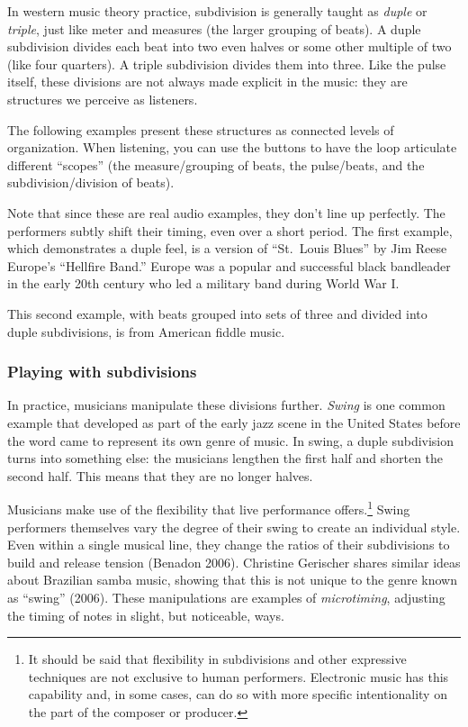 \documentclass[twoside]{article}
\begin{document}
In western music theory practice, subdivision is generally taught as
\emph{duple} or \emph{triple}, just like meter and measures (the larger
grouping of beats). A duple subdivision divides each beat into two even
halves or some other multiple of two (like four quarters). A triple
subdivision divides them into three. Like the pulse itself, these
divisions are not always made explicit in the music: they are structures
we perceive as listeners.

The following examples present these structures as connected levels of
organization. When listening, you can use the buttons to have the loop
articulate different ``scopes'' (the measure/grouping of beats, the
pulse/beats, and the subdivision/division of beats).

Note that since these are real audio examples, they don't line up
perfectly. The performers subtly shift their timing, even over a short
period. The first example, which demonstrates a duple feel, is a version
of ``St.~Louis Blues'' by Jim Reese Europe's ``Hellfire Band.'' Europe
was a popular and successful black bandleader in the early 20th century
who led a military band during World War I.

\hypertarget{example15}{}

This second example, with beats grouped into sets of three and divided
into duple subdivisions, is from American fiddle music.

\hypertarget{example16}{}

\hypertarget{playing-with-subdivisions}{%
\subsubsection{Playing with
subdivisions}\label{playing-with-subdivisions}}

In practice, musicians manipulate these divisions further. \emph{Swing}
is one common example that developed as part of the early jazz scene in
the United States before the word came to represent its own genre of
music. In swing, a duple subdivision turns into something else: the
musicians lengthen the first half and shorten the second half. This
means that they are no longer halves.

Musicians make use of the flexibility that live performance
offers.\footnote{It should be said that flexibility in subdivisions and
  other expressive techniques are not exclusive to human performers.
  Electronic music has this capability and, in some cases, can do so
  with more specific intentionality on the part of the composer or
  producer.} Swing performers themselves vary the degree of their swing
to create an individual style. Even within a single musical line, they
change the ratios of their subdivisions to build and release tension
(Benadon 2006). Christine Gerischer shares similar ideas about Brazilian
samba music, showing that this is not unique to the genre known as
``swing'' (2006). These manipulations are examples of
\emph{microtiming}, adjusting the timing of notes in slight, but
noticeable, ways.
\end{document}

